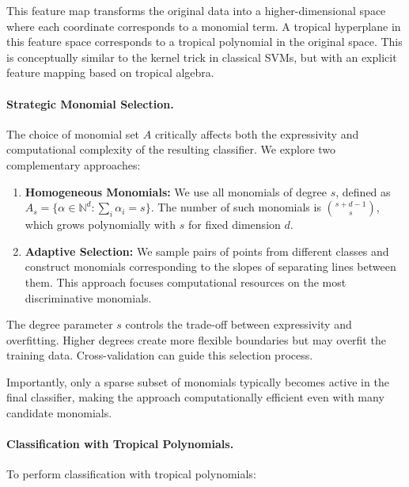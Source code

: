 \documentclass{article}
\begin{document}
This feature map transforms the original data into a higher-dimensional space where each coordinate corresponds to a monomial term. A tropical hyperplane in this feature space corresponds to a tropical polynomial in the original space. This is conceptually similar to the kernel trick in classical SVMs, but with an explicit feature mapping based on tropical algebra.

\paragraph{Strategic Monomial Selection.}
The choice of monomial set $A$ critically affects both the expressivity and computational complexity of the resulting classifier. We explore two complementary approaches:

\begin{enumerate}
    \item \textbf{Homogeneous Monomials:} We use all monomials of degree $s$, defined as 
    $A_s = \{\alpha \in \mathbb{N}^d : \sum_i \alpha_i = s\}$. The number of such monomials is $\binom{s+d-1}{s}$, which grows polynomially with $s$ for fixed dimension $d$.
    
    \item \textbf{Adaptive Selection:} We sample pairs of points from different classes and construct monomials corresponding to the slopes of separating lines between them. This approach focuses computational resources on the most discriminative monomials.
\end{enumerate}

The degree parameter $s$ controls the trade-off between expressivity and overfitting. Higher degrees create more flexible boundaries but may overfit the training data. Cross-validation can guide this selection process.

Importantly, only a sparse subset of monomials typically becomes active in the final classifier, making the approach computationally efficient even with many candidate monomials.

\paragraph{Classification with Tropical Polynomials.}\label{subsec:poly_classification}
To perform classification with tropical polynomials:
\end{document}

